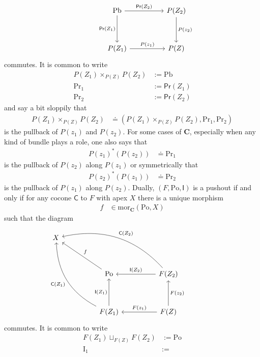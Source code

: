 \begin{exa}
\begin{enumerate}
\[\begin{tikzcd}[sep=huge]
  &
  \mathrm{Pb}
  \arrow{r}{\mathsf{Pr}(Z_{2})}
  \arrow[swap]{d}{\mathsf{Pr}(Z_{1})}
  &
  P(Z_{2})
  \arrow{d}{P(z_{2})}
  \\
  &
  P(Z_{1})
  \arrow{r}{P(z_{1})}
  &
  P(Z)
\end{tikzcd}
\]
commutes.
It is common to write
\begin{align*}
  P(Z_{1})
  \times_{P(Z)}
  P(Z_{2})
  &:=
  \mathrm{Pb}
  \\
  \mathrm{Pr}_{1}
  &:=
  \mathsf{Pr}(Z_{1})
  \\
  \mathrm{Pr}_{2}
  &:=
  \mathsf{Pr}(Z_{2})
\end{align*}
and say a bit sloppily that
\begin{align*}
  P(Z_{1})
  \times_{P(Z)}
  P(Z_{2})
  &\doteq
  \left(
    P(Z_{1})
    \times_{P(Z)}
    P(Z_{2}),
    \mathrm{Pr}_{1},
    \mathrm{Pr}_{2}
  \right)
\end{align*}
is the pullback of $P(z_{1})$ and $P(z_{2})$.
For some cases of $\mathbf{C}$, especially when any kind of bundle plays a role, one also says that
\begin{align*}
  P(z_{1})^{\ast}(P(z_{2}))
  &\doteq
  \mathrm{Pr}_{1}
\end{align*}
is the pullback of $P(z_{2})$ along $P(z_{1})$ or symmetrically that
\begin{align*}
  P(z_{2})^{\ast}(P(z_{1}))
  &\doteq
  \mathrm{Pr}_{2}
\end{align*}
is the pullback of $P(z_{1})$ along $P(z_{2})$.
Dually, $(F,\mathrm{Po},\mathsf{I})$ is a pushout if and only if for any cocone $\mathsf{C}$ to $F$ with apex $X$ there is a unique morphism
\begin{align*}
  f
  &\in
  \mathrm{mor}_{\mathbf{C}}(\mathrm{Po},X)
\end{align*}
such that the diagram
\[
\begin{tikzcd}[sep=huge]
  X
  &
  &
  &
  \\
  &
  \mathrm{Po}
  \arrow[swap]{ul}{f}
  &
  F(Z_{2})
  \arrow[swap]{l}{\mathsf{I}(Z_{2})}
  \arrow[swap,bend right=30]{ull}{\mathsf{C}(Z_{2})}
  \\
  &
  F(Z_{1})
  \arrow{u}{\mathsf{I}(Z_{1})}
  \arrow[bend left=30]{uul}{\mathsf{C}(Z_{1})}
  &
  F(Z)
  \arrow[swap]{u}{F(z_{2})}
  \arrow[swap]{l}{F(z_{1})}
\end{tikzcd}
\]
commutes.
It is common to write
\begin{align*}
  F(Z_{1})
  \sqcup_{F(Z)}
  F(Z_{2})
  &:=
  \mathrm{Po}
  \\
  \mathrm{I}_{1}
  &:=

\end{align*}
\end{enumerate}
\end{exa}
